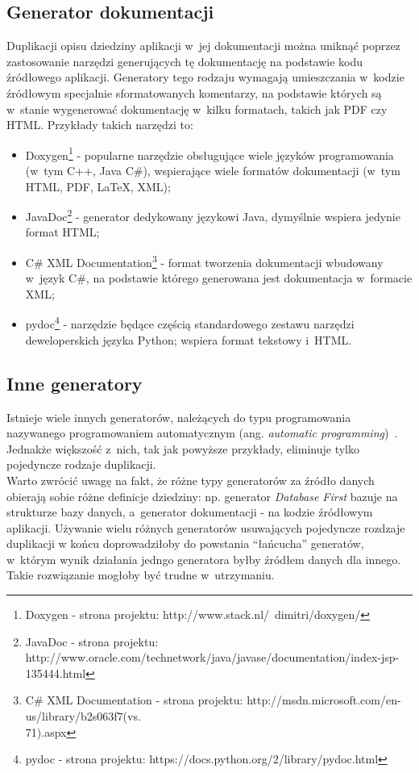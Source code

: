 \subsection{Generator dokumentacji}

Duplikacji opisu dziedziny aplikacji w~jej dokumentacji można uniknąć poprzez zastosowanie narzędzi generujących tę dokumentację na podstawie kodu źródłowego aplikacji.
Generatory tego rodzaju wymagają umieszczania w~kodzie źródłowym specjalnie sformatowanych komentarzy, na podstawie których są w~stanie wygenerować dokumentację w~kilku formatach, takich jak PDF czy HTML.
Przykłady takich narzędzi to:

\begin{itemize}
 \item Doxygen\footnote{Doxygen - strona projektu: http://www.stack.nl/~dimitri/doxygen/} - popularne narzędzie obsługujące wiele języków programowania (w~tym C++, Java C\#), wspierające wiele formatów dokumentacji (w~tym HTML, PDF, LaTeX, XML);
 \item JavaDoc\footnote{JavaDoc - strona projektu: http://www.oracle.com/technetwork/java/javase/documentation/index-jsp-135444.html} - generator dedykowany językowi Java, dymyślnie wspiera jedynie format HTML;
 \item C\# XML Documentation\footnote{C\# XML Documentation - strona projektu: http://msdn.microsoft.com/en-us/library/b2s063f7(vs.\\71).aspx} - format tworzenia dokumentacji wbudowany w~język C\#, na podstawie którego generowana jest dokumentacja w~formacie XML;
 \item pydoc\footnote{pydoc - strona projektu: https://docs.python.org/2/library/pydoc.html} - narzędzie będące częścią standardowego zestawu narzędzi deweloperskich języka Python; wspiera format tekstowy i~HTML.
\end{itemize}


\subsection{Inne generatory}

Istnieje wiele innych generatorów, należących do typu programowania nazywanego programowaniem automatycznym (ang. \emph{automatic programming})~\cite{auto_prog}.
Jednakże większość z~nich, tak jak powyższe przykłady, eliminuje tylko pojedyncze rodzaje duplikacji.\\

Warto zwrócić uwagę na fakt, że różne typy generatorów za źródło danych obierają sobie różne definicje dziedziny: np. generator \emph{Database First} bazuje na strukturze bazy danych, a~generator dokumentacji - na kodzie źródłowym aplikacji.
Używanie wielu różnych generatorów usuwających pojedyncze rozdzaje duplikacji w końcu doprowadziłoby do powstania ``łańcucha'' generatów, w~którym wynik działania jedngo generatora byłby źródłem danych dla innego.
Takie rozwiązanie mogłoby być trudne w~utrzymaniu.




